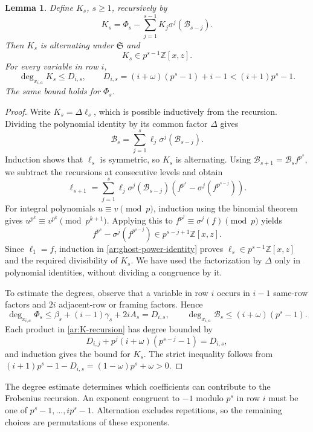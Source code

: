 \documentclass[11pt]{amsart}
\newtheorem{lemma}[theorem]{Lemma}
\theoremstyle{definition}
\theoremstyle{remark}
\numberwithin{equation}{section}
\newcommand{\Z}{\mathbb Z}
\begin{document}
\begin{lemma}\label{ar:ghost-divisibility}
Define $K_s$, $s\geq1$, recursively by
\begin{equation}\label{ar:K-recursion}
 K_s=\Phi_s-\sum_{j=1}^{s-1}K_j\sigma^j(\mathcal B_{s-j}).
\end{equation}
Then $K_s$ is alternating under $\mathfrak S$ and
\[
 K_s\in p^{s-1}\Z[x,z].
\]
For every variable in row $i$,
\begin{equation}\label{ar:degree-bound}
 \deg_{x_{i,a}}K_s\leq D_{i,s},\qquad
 D_{i,s}=(i+\omega)(p^s-1)+i-1<(i+1)p^s-1.
\end{equation}
The same bound holds for $\Phi_s$.
\end{lemma}

\begin{proof}
Write $K_s=\Delta\ell_s$, which is possible inductively from the
recursion. Dividing the polynomial identity by its common factor
$\Delta$ gives
\[
 \mathcal B_s=\sum_{j=1}^s\ell_j\sigma^j(\mathcal B_{s-j}).
\]
Induction shows that $\ell_s$ is symmetric, so $K_s$ is
alternating. Using $\mathcal B_{s+1}=\mathcal B_sf^{p^s}$, we
subtract the recursions at consecutive levels and obtain
\begin{equation}\label{ar:ghost-power-identity}
 \ell_{s+1}=
 \sum_{j=1}^s\ell_j\sigma^j(\mathcal B_{s-j})
 \left(f^{p^s}-\sigma^j(f^{p^{s-j}})\right).
\end{equation}
For integral polynomials $u\equiv v\pmod p$, induction using the
binomial theorem gives
$u^{p^k}\equiv v^{p^k}\pmod{p^{k+1}}$. Applying this to
$f^{p^j}\equiv\sigma^j(f)\pmod p$ yields
\[
 f^{p^s}-\sigma^j(f^{p^{s-j}})\in p^{s-j+1}\Z[x,z].
\]
Since $\ell_1=f$, induction in \eqref{ar:ghost-power-identity}
proves $\ell_s\in p^{s-1}\Z[x,z]$ and the required divisibility
of $K_s$. We have used the factorization by $\Delta$ only in
polynomial identities, without dividing a congruence by it.

To estimate the degrees, observe that a variable in row $i$
occurs in $i-1$ same-row factors and $2i$ adjacent-row or framing
factors. Hence
\[
 \deg_{x_{i,a}}\Phi_s
 \leq\beta_s+(i-1)\gamma_s+2iA_s=D_{i,s},
 \qquad
 \deg_{x_{i,a}}\mathcal B_s\leq(i+\omega)(p^s-1).
\]
Each product in \eqref{ar:K-recursion} has degree bounded by
\[
 D_{i,j}+p^j(i+\omega)(p^{s-j}-1)=D_{i,s},
\]
and induction gives the bound for $K_s$. The strict inequality
follows from
$(i+1)p^s-1-D_{i,s}=(1-\omega)p^s+\omega>0$.
\end{proof}

The degree estimate determines which coefficients can contribute
to the Frobenius recursion. An exponent congruent to $-1$ modulo
$p^s$ in row $i$ must be one of $p^s-1,\ldots,ip^s-1$.
Alternation excludes repetitions, so the remaining choices are
permutations of these exponents.
\end{document}

